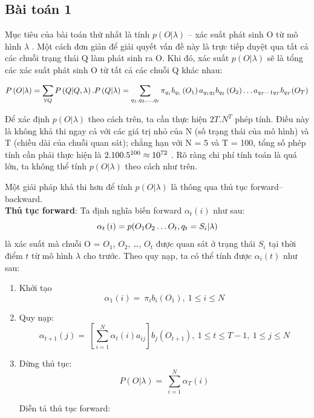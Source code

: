 \documentclass[13pt]{extreport}
\begin{document}
\subsection{\textbf{{Bài toán 1}}} 
Mục tiêu của bài toán thứ nhất là tính $ p \left( O \vert  \lambda  \right)  $
 – xác suất phát sinh O từ mô hình $  \lambda  $
. Một cách đơn giản để giải quyết vấn đề này là trực tiếp duyệt qua tất cả các chuỗi trạng thái Q làm phát sinh ra O. Khi đó, xác suất $ p \left( O \vert  \lambda  \right)  $
 sẽ là tổng các xác suất phát sinh O từ tất cả các chuỗi Q khác nhau: 

 $$P\left( {O{\rm{|}}\lambda } \right) = \mathop \sum \limits_{\forall Q} P\left( {Q{\rm{|}}Q,\lambda } \right).P\left( {Q{\rm{|}}\lambda } \right)
     = \mathop \sum \limits_{{q_1},{q_2}, \ldots ,{q_t}} {\pi _{{q_1}}}{b_{{q_1}}}\left( {{O_1}} \right){a_{{q_1}{q_2}}}{b_{{q_2}}}\left( {{O_2}} \right) \ldots {a_{{q_T} - 1{q_T}}}{b_{{q_T}}}({O_T})$$
    
Để xác định $p(O|\lambda )$ theo cách trên, ta cần thực hiện $2T.N^T$ phép tính. Điều này là không khả thi ngay cả với các giá trị nhỏ của N (số trạng thái của mô hình) và T (chiều dài của chuỗi quan sát); chẳng hạn với N = 5 và T = 100, tổng số phép tính cần phải thực hiện là ${2.100.5^{100}}{\rm{}} \approx {\rm{}}{10^{72}}$
. Rõ ràng chi phí tính toán là quá lớn, ta không thể tính $ p \left( O \vert  \lambda  \right)  $
 theo cách như trên. \par
Một giải pháp khả thi hơn để tính $ p \left( O \vert  \lambda  \right)  $
 là thông qua thủ tục forward–backward.\\
\textbf{Thủ tục forward}: Ta định nghĩa biến forward $  \alpha_{t} \left( i \right)  $ như sau: $${\alpha _t}\left( i \right) = p{\rm{(}}{O_1}{O_2} \ldots {O_t},{q_t} = {S_i}{\rm{|}}\lambda ) $$
 là xác suất mà chuỗi O =   $O_1$, $O_2$, …, $O_t$ được quan sát ở trạng thái $S_i$ tại thời điểm $t$  từ mô hình $  \lambda  $ cho trước. 
Theo quy nạp, ta có thể tính được $\alpha_i(t)$ như sau: \par
\begin{enumerate}
\item Khởi tạo
$$ \alpha _{1} \left( i \right) =~ \pi _{i}b_{i} \left( O_{1} \right) ,~1 \leq i \leq N $$

\item Quy nạp:
\begin{equation}
\alpha _{t+1} \left( j \right) =~\left[ \sum_{i=1}^{N} \alpha _t (i) a_{ij} \right] b_{j} \left( O_{t+1} \right),  ~1 \leq t \leq T-1, ~1 \leq j \leq N
\end{equation}

\item Dừng thủ tục: 
$$ P \left( O \vert  \lambda  \right) =~ \sum _{i=1}^{N} \alpha _{T} \left( i \right)  $$

\vspace{12pt}

Diễn tả thủ tục forward:  \par
\end{enumerate}
\end{document}
